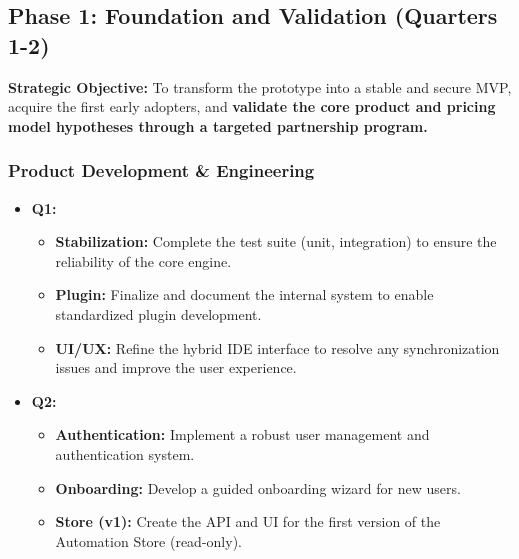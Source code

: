 \documentclass[11pt, a4paper, oneside]{article}
\begin{document}
\subsection{Phase 1: Foundation and Validation (Quarters 1-2)}
\textbf{Strategic Objective:} To transform the prototype into a stable and secure MVP, acquire the first early adopters, and \textbf{validate the core product and pricing model hypotheses through a targeted partnership program.}

\subsubsection*{Product Development \& Engineering}
\begin{itemize}[leftmargin=*]
    \item \textbf{Q1:}
    \begin{itemize}
        \item \textbf{Stabilization:} Complete the test suite (unit, integration) to ensure the reliability of the core engine.
        \item \textbf{Plugin:} Finalize and document the internal system to enable standardized plugin development.
        \item \textbf{UI/UX:} Refine the hybrid IDE interface to resolve any synchronization issues and improve the user experience.
    \end{itemize}
    \item \textbf{Q2:}
    \begin{itemize}
        \item \textbf{Authentication:} Implement a robust user management and authentication system.
        \item \textbf{Onboarding:} Develop a guided onboarding wizard for new users.
        \item \textbf{Store (v1):} Create the API and UI for the first version of the Automation Store (read-only).
    \end{itemize}
\end{itemize}
\end{document}
